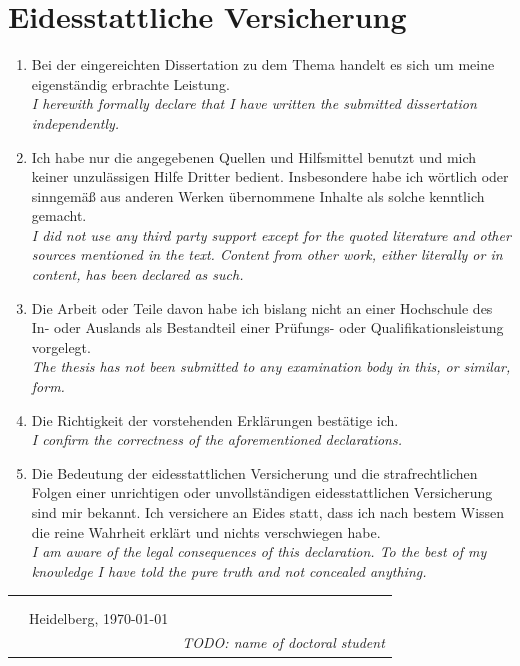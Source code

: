 \chapter*{Eidesstattliche Versicherung}
    
    \begin{enumerate}
        \setlength{\itemsep}{0pt}
        \item Bei der eingereichten Dissertation zu dem Thema \emph{\textbf{\thesistitle}} handelt es sich um meine eigenständig erbrachte Leistung.\\
        \emph{\small\color{dkfzgray2} I herewith formally declare that I have written the submitted dissertation \textbf{\thesistitle} independently.}
        
        \item Ich habe nur die angegebenen Quellen und Hilfsmittel benutzt und mich keiner unzulässigen Hilfe Dritter bedient. Insbesondere habe ich wörtlich oder sinngemäß aus anderen Werken übernommene Inhalte als solche kenntlich gemacht.\\
        \emph{\small\color{dkfzgray2}  I did not use any third party support except for the quoted literature and other sources mentioned in the text. Content from other work, either literally or in content, has been declared as such.}
        
        \item Die Arbeit oder Teile davon habe ich bislang nicht an einer Hochschule des In- oder Auslands als Bestandteil einer Prüfungs- oder Qualifikationsleistung vorgelegt.\\
        \emph{\small\color{dkfzgray2} The thesis has not been submitted to any examination body in this, or similar, form. }
        
        \item Die Richtigkeit der vorstehenden Erklärungen bestätige ich.\\
        \emph{\small\color{dkfzgray2} I confirm the correctness of the aforementioned declarations.}
        
        \item Die Bedeutung der eidesstattlichen Versicherung und die strafrechtlichen Folgen einer unrichtigen oder unvollständigen eidesstattlichen Versicherung sind mir bekannt. Ich versichere an Eides statt, dass ich nach bestem Wissen die reine Wahrheit erklärt und nichts verschwiegen habe.\\
        \emph{\small\color{dkfzgray2} I am aware of the legal consequences of this declaration. To the best of my knowledge I have told the pure truth and not concealed anything.}
    \end{enumerate}
    
    \begin{tabular}{p{3cm}p{5cm}p{4cm}}
          &  & \\
          & & \\
          &Heidelberg, \today & \hrulefill\\
          & & \textit{TODO: name of doctoral student}
    \end{tabular}
